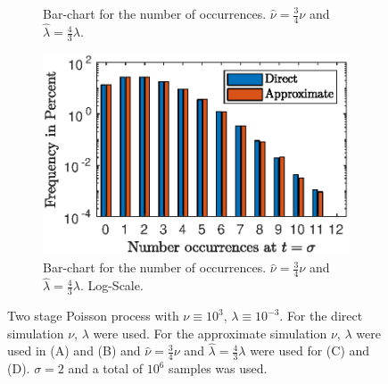 \documentclass{amsart}
\numberwithin{equation}{section}
\begin{document}
\begin{figure}[ht]
\begin{subfigure}[t]{0.475\textwidth}
        \caption{Bar-chart for the number of occurrences. $\hat{\nu} = \frac{3}{4} \nu$ and $\hat{\lambda} = \frac{4}{3} \lambda$.}
    \end{subfigure}
    \hfill
    \begin{subfigure}[t]{0.475\textwidth}
        \centering
        \includegraphics[width=\textwidth]{poissproc02_changed_2.eps}
        \caption{Bar-chart for the number of occurrences. $\hat{\nu} = \frac{3}{4} \nu$ and $\hat{\lambda} = \frac{4}{3} \lambda$. Log-Scale.}
    \end{subfigure}
    \caption{Two stage Poisson process with $\nu \equiv 10^3$, $\lambda \equiv 10^{-3}$. For the direct simulation $\nu$, $\lambda$ were used. For the approximate simulation $\nu$, $\lambda$ were used in (A) and (B) and $\hat{\nu} = \frac{3}{4} \nu$ and $\hat{\lambda} = \frac{4}{3} \lambda$ were used for (C) and (D). $\sigma = 2$ and a total of $10^6$ samples was used.}
    \label{fig:numPoissProcTwo}
\end{figure}

\clearpage
\printbibliography
\end{document}

